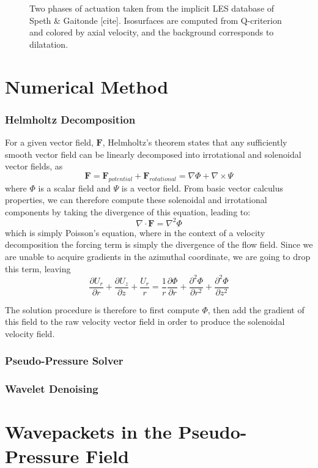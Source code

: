 \begin{figure}
\begin{subfigure}{.5\textwidth}
		\caption{}
	\end{subfigure}
	\caption{Two phases of actuation taken from the implicit LES database of Speth \& Gaitonde [cite]. Isosurfaces are computed from Q-criterion and colored by axial velocity, and the background corresponds to dilatation.}
	\label{fig:LES_dilatation}
\end{figure}
\section{Numerical Method}
\subsubsection{Helmholtz Decomposition}
	For a given vector field, $\mathbf{F}$, Helmholtz's theorem states that any sufficiently smooth vector field can be linearly decomposed into irrotational and solenoidal vector fields, as
	\begin{equation}
	\mathbf{F} = \mathbf{F}_{potential} + \mathbf{F}_{rotational} = \nabla \Phi + \nabla \times \Psi
	\end{equation}
	where $\Phi$ is a scalar field and $\Psi$ is a vector field.
	From basic vector calculus properties, we can therefore compute these solenoidal and irrotational components by taking the divergence of this equation, leading to:
	\begin{equation}
	\nabla \cdot \mathbf{F} = \nabla^{2} \Phi
	\end{equation}
	which is simply Poisson's equation, where in the context of a velocity decomposition the forcing term is simply the divergence of the flow field.
	Since we are unable to acquire gradients in the azimuthal coordinate, we are going to drop this term, leaving
	\begin{equation}
	\frac{\partial U_r}{\partial r} + \frac{\partial U_z}{\partial z} + \frac{U_r}{r} = \frac{1}{r} \frac{\partial \Phi}{\partial r} + \frac{\partial^2 \Phi}{\partial r^2} + \frac{\partial^2 \Phi}{\partial z^2} 
	\end{equation}
	
	The solution procedure is therefore to first compute $\Phi$, then add the gradient of this field to the raw velocity vector field in order to produce the solenoidal velocity field.
\subsubsection{Pseudo-Pressure Solver}
\subsubsection{Wavelet Denoising}
\section{Wavepackets in the Pseudo-Pressure Field}